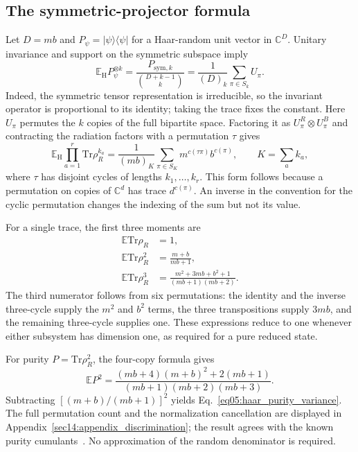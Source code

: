 \documentclass[11pt,letterpaper]{article}
\theoremstyle{plain}
\theoremstyle{definition}
\theoremstyle{remark}
\begin{document}
\subsection{The symmetric-projector formula}
\label{subsec12:normalized_moments}

Let $D=mb$ and $P_\psi=|\psi\rangle\langle\psi|$ for a Haar-random
unit vector in $\mathbb C^D$.  Unitary invariance and support on the
symmetric subspace imply
\begin{equation}
\label{eq12:symmetric_projector}
 \mathbb E_{\mathrm H}P_\psi^{\otimes k}
 =\frac{P_{\mathrm{sym},k}}{\binom{D+k-1}{k}}
 =\frac{1}{(D)_k}\sum_{\pi\in S_k}U_\pi.
\end{equation}
Indeed, the symmetric tensor representation is irreducible, so the
invariant operator is proportional to its identity; taking the trace
fixes the constant.  Here $U_\pi$ permutes the $k$ copies of the full
bipartite space.  Factoring it as $U_\pi^R\otimes U_\pi^B$ and
contracting the radiation factors with a permutation $\tau$ gives
\begin{equation}
\label{eq12:multi_trace}
 \mathbb E_{\mathrm H}\prod_{a=1}^r\mathrm{Tr}\rho_R^{k_a}
 =\frac{1}{(mb)_K}
  \sum_{\pi\in S_K}m^{c(\tau\pi)}b^{c(\pi)},
 \qquad K=\sum_a k_a,
\end{equation}
where $\tau$ has disjoint cycles of lengths $k_1,\ldots,k_r$.
This form follows because a permutation on copies of $\mathbb C^d$
has trace $d^{c(\pi)}$.  An inverse in the convention for the cyclic
permutation changes the indexing of the sum but not its value.

For a single trace, the first three moments are
\begin{align}
\label{eq12:first_moments}
 \mathbb E\mathrm{Tr}\rho_R&=1,\nonumber\\
 \mathbb E\mathrm{Tr}\rho_R^2&=\frac{m+b}{mb+1},\nonumber\\
 \mathbb E\mathrm{Tr}\rho_R^3
 &=\frac{m^2+3mb+b^2+1}{(mb+1)(mb+2)}.
\end{align}
The third numerator follows from six permutations: the identity and
the inverse three-cycle supply the $m^2$ and $b^2$ terms, the three
transpositions supply $3mb$, and the remaining three-cycle supplies
one.  These expressions reduce to one whenever either subsystem has
dimension one, as required for a pure reduced state.

For purity $P=\mathrm{Tr}\rho_R^2$, the four-copy formula gives
\begin{equation}
\label{eq12:purity_second_moment}
 \mathbb E P^2
 =\frac{(mb+4)(m+b)^2+2(mb+1)}
 {(mb+1)(mb+2)(mb+3)}.
\end{equation}
Subtracting $[(m+b)/(mb+1)]^2$ yields
Eq.~\eqref{eq05:haar_purity_variance}.  The full permutation count
and the normalization cancellation are displayed in
Appendix~\ref{sec14:appendix_discrimination}; the result agrees with
the known purity cumulants~\cite{giraud2007}.  No approximation of
the random denominator is required.
\end{document}
